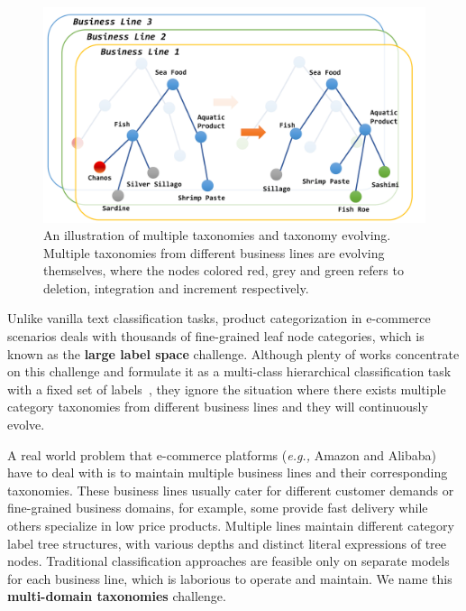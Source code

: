\begin{figure}[tbp]
  \centering
  \includegraphics[width=\linewidth]{teaser}
  \caption{An illustration of multiple taxonomies and taxonomy evolving. Multiple taxonomies from different business lines are evolving themselves, where the nodes colored red, grey and green refers to deletion, integration and increment respectively.}
  \label{fig:teaser}
\end{figure}

Unlike vanilla text classification tasks, product categorization in e-commerce scenarios deals with thousands of fine-grained leaf node categories, which is known as the \textbf{large label space} challenge.
Although plenty of works concentrate on this challenge and formulate it as a multi-class hierarchical classification task with a fixed set of labels~\cite{kozareva2015everyone, cevahir2016large}, they ignore the situation where there exists multiple category taxonomies from different business lines and they will continuously evolve. 

A real world problem that e-commerce platforms (\textit{e.g.,} Amazon and Alibaba) have to deal with is to maintain multiple business lines and their corresponding taxonomies.
These business lines usually cater for different customer demands or fine-grained business domains, for example, some provide fast delivery while others specialize in low price products. 
Multiple lines maintain different category label tree structures, with various depths and distinct literal expressions of tree nodes. Traditional classification approaches are feasible only on separate models for each business line, which is laborious to operate and maintain. 
We name this \textbf{multi-domain taxonomies} challenge.

